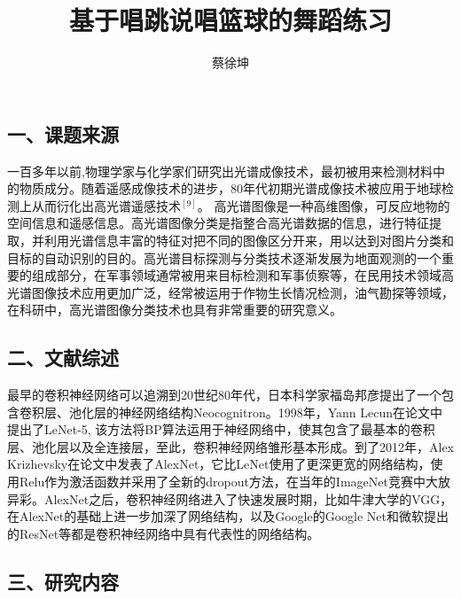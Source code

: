 \documentclass[UTF8,zihao=-4]{oucart}
\title{基于唱跳说唱篮球的舞蹈练习}
\author{蔡徐坤}
\begin{document}
    \makecoveror

    \newpage

    \setcounter{page}{1}

    \subsection*{一、课题来源}

    \begin{framed}

        一百多年以前,物理学家与化学家们研究出光谱成像技术，最初被用来检测材料中的物质成分。随着遥感成像技术的进步，80年代初期光谱成像技术被应用于地球检测上从而衍化出高光谱遥感技术$^{[9]}$。 高光谱图像是一种高维图像，可反应地物的空间信息和遥感信息。高光谱图像分类是指整合高光谱数据的信息，进行特征提取，并利用光谱信息丰富的特征对把不同的图像区分开来，用以达到对图片分类和目标的自动识别的目的。高光谱目标探测与分类技术逐渐发展为地面观测的一个重要的组成部分，在军事领域通常被用来目标检测和军事侦察等，在民用技术领域高光谱图像技术应用更加广泛，经常被运用于作物生长情况检测，油气勘探等领域，在科研中，高光谱图像分类技术也具有非常重要的研究意义。

    \end{framed}

    \subsection*{二、文献综述}

    \begin{framed}
        最早的卷积神经网络可以追溯到20世纪80年代，日本科学家福岛邦彦提出了一个包含卷积层、池化层的神经网络结构Neocognitron\cite{ref1}。1998年，Yann Lecun在论文中提出了LeNet-5\cite{ref2}, 该方法将BP算法运用于神经网络中，使其包含了最基本的卷积层、池化层以及全连接层，至此，卷积神经网络雏形基本形成。到了2012年，Alex Krizhevsky在论文中发表了AlexNet\cite{ref3}，它比LeNet使用了更深更宽的网络结构，使用Relu作为激活函数并采用了全新的dropout方法，在当年的ImageNet竞赛中大放异彩。AlexNet之后，卷积神经网络进入了快速发展时期，比如牛津大学的VGG\cite{ref4}，在AlexNet的基础上进一步加深了网络结构，以及Google的Google Net\cite{ref5}和微软提出的ResNet\cite{ref6}等都是卷积神经网络中具有代表性的网络结构。

        \printbibliography
        
    \end{framed}

    \subsection*{三、研究内容}
\end{document}
